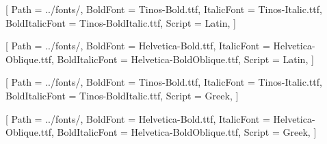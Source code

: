 \usepackage[top=2.5cm, left=2.5cm, right=2.5cm, bottom=2.5cm, headheight=1.25cm, footskip=1.25cm]{geometry}

\usepackage{fontspec}
\usepackage{polyglossia}

\setmainlanguage{english}

\usepackage{fontspec}

\setmainfont{Tinos-Regular.ttf}[
    Path = ../fonts/,
    BoldFont = Tinos-Bold.ttf,
    ItalicFont = Tinos-Italic.ttf,
    BoldItalicFont = Tinos-BoldItalic.ttf,
    Script = Latin,
]

\setsansfont{Helvetica.ttf}[
    Path = ../fonts/,
    BoldFont = Helvetica-Bold.ttf,
    ItalicFont = Helvetica-Oblique.ttf,
    BoldItalicFont = Helvetica-BoldOblique.ttf,
    Script = Latin,
]

\newfontfamily{}[
    Path = ../fonts/,
    BoldFont = Tinos-Bold.ttf,
    ItalicFont = Tinos-Italic.ttf,
    BoldItalicFont = Tinos-BoldItalic.ttf,
    Script = Greek,
]

\newfontfamily{}[
    Path = ../fonts/,
    BoldFont = Helvetica-Bold.ttf,
    ItalicFont = Helvetica-Oblique.ttf,
    BoldItalicFont = Helvetica-BoldOblique.ttf,
    Script = Greek,
]

\usepackage[
  backend=biber,
  bibstyle=ieee,
  citestyle=ieee-comp,
  sorting=none,
]{biblatex}


\usepackage{xparse}
\usepackage{booktabs}
\usepackage{xcolor}
\usepackage{marginnote}
\usepackage{amssymb}
\usepackage{float}
\usepackage[en-US]{datetime2}
\usepackage{amsmath}
\usepackage{microtype}
\usepackage{graphicx}
\graphicspath{ {../assets/} }
\usepackage{adjustbox}
\usepackage{tabularx}
\usepackage{appendix}
\usepackage{listings}
\usepackage{color}
\usepackage{setspace}
\usepackage{fancyhdr}
\usepackage{url}
\usepackage{caption}
\usepackage{chngcntr}
\usepackage{titlesec}
\usepackage{amsfonts}
\usepackage{pgf}
\usepackage{pgfplots}
\pgfplotsset{compat=1.18}
\usepackage{siunitx}
\usepackage{subcaption}

\usepackage{minted}


